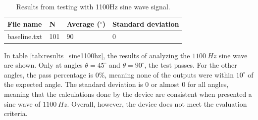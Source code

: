 \documentclass[a4paper]{article}
\begin{document}
\begin{table}[H]
    \begin{center}
        \begin{tabular}{ | m{5em} | m{2em} | m{3.5em} | m{3.5em} | }
            \hline
            File name    & N   & Average ($^{\circ}$) & Standard deviation \\
            \hline
            \hline
            baseline.txt & 101 & 90                   & 0                  \\
            \hline
        \end{tabular}
        \caption{Results from testing with 1100Hz sine wave signal.}
        \label{tab:results_baseline}
    \end{center}
\end{table}

In table \ref{tab:results_sine1100hz}, the results of analyzing the $1100\ Hz$ sine wave are shown. Only at angles $\theta = 45^{\circ}$ and $\theta = 90^{\circ}$, the test passes. For the other angles, the pass percentage is $0 \%$, meaning none of the outputs were within $10^{\circ}$ of the expected angle. The standard deviation is $0$ or almost $0$ for all angles, meaning that the calculations done by the device are consistent when presented a sine wave of $1100\ Hz$. Overall, however, the device does not meet the evaluation criteria.
\end{document}
